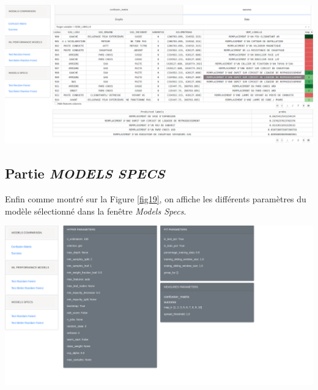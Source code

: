 \begin{center}
\includegraphics[scale=0.25]{figures/app_models_table.png}
\label{fig18}
\end{center}

\subsection{Partie \textit{MODELS SPECS}}

Enfin comme montré sur la Figure \ref{fig19}, on affiche les différents paramètres du modèle sélectionné dans la fenêtre \textit{Models Specs}.

\begin{center}
\includegraphics[scale=0.30]{figures/app_specs.png}
\label{fig19}
\end{center}
